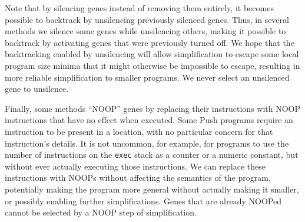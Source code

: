 Note that by silencing genes instead of removing them entirely, it 
becomes possible to backtrack by unsilencing previously silenced genes. 
Thus, in several methods 
we silence some genes while unsilencing others, making it possible to 
backtrack by activating genes that were previously turned off. We hope that the backtracking enabled by unsilencing will allow simplification to escape some local program size minima that it might otherwise be impossible to escape, resulting in more reliable simplification to smaller programs. We never select an unsilenced gene to unsilence. 

Finally, some methods ``NOOP'' genes by replacing their instructions with 
NOOP instructions that have no effect when executed. 
Some Push programs require an instruction to be present in a location, 
with no particular concern for that instruction's details. It is not
uncommon, for example, for programs to use the number of instructions on
the \texttt{exec} stack as a counter or a numeric constant, but without ever
actually executing those instructions. 
We can replace these instructions with NOOPs without affecting the semantics
of the program, potentially making the program more general without actually 
making it smaller, or possibly enabling further simplifications. 
Genes that are already NOOPed cannot be selected by a NOOP step of 
simplification.

